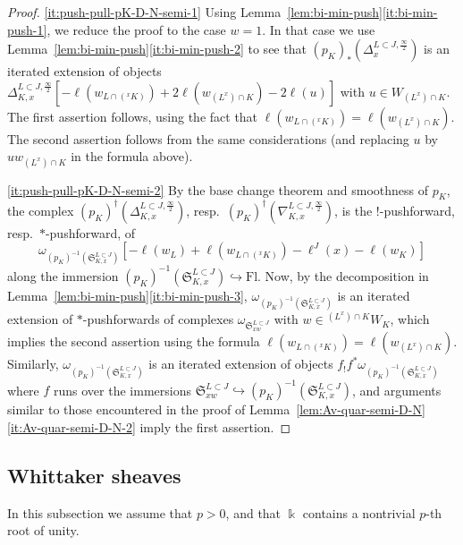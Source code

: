 \documentclass[11pt]{amsart}
\numberwithin{equation}{section}
\theoremstyle{plain}
\theoremstyle{definition}
\renewcommand{\k}{\Bbbk}
\newcommand{\semi}{{{\frac{\infty}{2}}}}
\newcommand{\Fl}{\mathrm{Fl}}
\newcommand{\rS}{\mathfrak{S}}
\begin{document}
\begin{proof}
\eqref{it:push-pull-pK-D-N-semi-1}
Using Lemma~\ref{lem:bi-min-push}\eqref{it:bi-min-push-1}, we reduce the proof to the case $w=1$. In that case we use Lemma~\ref{lem:bi-min-push}\eqref{it:bi-min-push-2} to see that $(p_K)_*(\Delta^{L \subset J,\semi}_{x})$ is an iterated extension of objects $\Delta^{L \subset J,\semi}_{K,x}[-\ell(w_{L \cap ({}^x K)}) + 2\ell(w_{(L^x) \cap K})-2\ell(u)]$ with $u\in W_{(L^x)\cap K}$. 
The first assertion follows, using the fact that $\ell(w_{L \cap ({}^x K)}) = \ell(w_{(L^x) \cap K})$. 
The second assertion follows from the same considerations (and replacing $u$ by $u w_{(L^x) \cap K}$ in the formula above).

\eqref{it:push-pull-pK-D-N-semi-2}
By the base change theorem and smoothness of $p_K$, the complex $(p_K)^\dag(\Delta^{L \subset J,\semi}_{K,x})$, resp.~$(p_K)^\dag(\nabla^{L \subset J,\semi}_{K,x})$, is the $!$-pushforward, resp.~$*$-pushforward, of
\[
\omega_{(p_K)^{-1}(\rS^{L \subset J}_{K,x})}[-\ell(w_L)+\ell(w_{L \cap ({}^x K)})-\ell^J(x)-\ell(w_K)]
\]
along the immersion $(p_K)^{-1}(\rS^{L \subset J}_{K,x}) \hookrightarrow \Fl$. Now, by the decomposition in Lem\-ma~\ref{lem:bi-min-push}\eqref{it:bi-min-push-3}, $\omega_{(p_K)^{-1}(\rS^{L \subset J}_{K,x})}$ is an iterated extension of $*$-pushforwards of complexes $\omega_{\rS^{L \subset J}_{xw}}$ with $w \in {}^{(L^x) \cap K} W_K$, which implies the second assertion using the formula $\ell(w_{L \cap ({}^x K)}) = \ell(w_{(L^x) \cap K})$. Similarly, $\omega_{(p_K)^{-1}(\rS^{L \subset J}_{K,x})}$ is an iterated extension of objects $f_! f^* \omega_{(p_K)^{-1}(\rS^{L \subset J}_{K,x})}$ where $f$ runs over the immersions $\rS^{L \subset J}_{xw} \hookrightarrow (p_K)^{-1}(\rS^{L \subset J}_{K,x})$, and arguments similar to those encountered in the proof of Lemma~\ref{lem:Av-quar-semi-D-N}\eqref{it:Av-quar-semi-D-N-2}
imply the first assertion.
\end{proof}

\subsection{Whittaker sheaves} 
\label{ss:Whittaker}

In this subsection we assume that $p>0$, and that $\k$ contains a nontrivial $p$-th root of unity.

\end{document}
